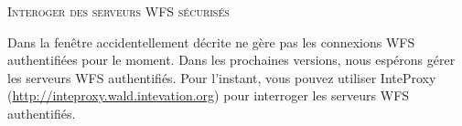 \begin{Tip}[htb]\caption{\textsc{Interoger des serveurs WFS sécurisés}}
Dans la fenêtre  accidentellement décrite
\qg ne gère pas les connexions WFS authentifiées pour le moment. Dans les prochaines versions,
nous espérons gérer les serveurs WFS authentifiés. Pour l'instant, vous pouvez utiliser 
InteProxy (\url{http://inteproxy.wald.intevation.org}) pour interroger les serveurs WFS authentifiés.
\end{Tip} 
